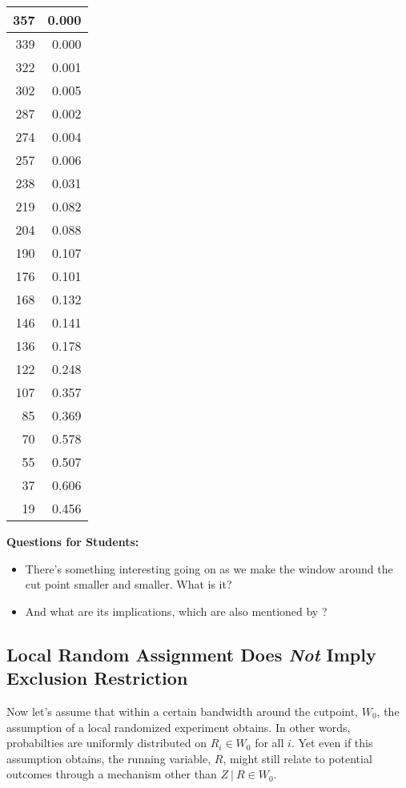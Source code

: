 \documentclass[11pt,leqno]{article}\usepackage[]{graphicx}\usepackage[]{color}
\newenvironment{knitrout}{}{} %
\newcommand\given[1][]{\:#1\vert\:}
\theoremstyle{newstyle}
\begin{document}
\begin{knitrout}
\begin{tabular}{r|r}
\hline
357 & 0.000\\
\hline
339 & 0.000\\
\hline
322 & 0.001\\
\hline
302 & 0.005\\
\hline
287 & 0.002\\
\hline
274 & 0.004\\
\hline
257 & 0.006\\
\hline
238 & 0.031\\
\hline
219 & 0.082\\
\hline
204 & 0.088\\
\hline
190 & 0.107\\
\hline
176 & 0.101\\
\hline
168 & 0.132\\
\hline
146 & 0.141\\
\hline
136 & 0.178\\
\hline
122 & 0.248\\
\hline
107 & 0.357\\
\hline
85 & 0.369\\
\hline
70 & 0.578\\
\hline
55 & 0.507\\
\hline
37 & 0.606\\
\hline
19 & 0.456\\
\hline
\end{tabular}


\end{knitrout}

\vspace{5mm}
\begin{mdframed}
\textbf{Questions for Students:}
\vspace{-5mm}
\begin{itemize}\itemsep1pt
\item There's something interesting going on as we make the window around the cut point smaller and smaller. What is it?
\item And what are its implications, which are also mentioned by \citet{caugheysekhon2011}?
\end{itemize}
\end{mdframed}

\subsection{Local Random Assignment Does \textit{Not} Imply Exclusion Restriction}

Now let's assume that within a certain bandwidth around the cutpoint, $W_0$, the assumption of a local randomized experiment obtains. In other words, probabilties are uniformly distributed on $R_i \in W_0$ for all $i$. Yet even if this assumption obtains, the running variable, $R$, might still relate to potential outcomes through a mechanism other than $Z \given R \in W_0$.
\end{document}

